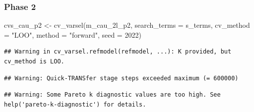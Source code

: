 \documentclass[
]{article}
\newenvironment{Shaded}{\begin{snugshade}}{\end{snugshade}}
\newcommand{\AttributeTok}[1]{\textcolor[rgb]{0.77,0.63,0.00}{#1}}
\newcommand{\DecValTok}[1]{\textcolor[rgb]{0.00,0.00,0.81}{#1}}
\newcommand{\FunctionTok}[1]{\textcolor[rgb]{0.00,0.00,0.00}{#1}}
\newcommand{\NormalTok}[1]{#1}
\newcommand{\OtherTok}[1]{\textcolor[rgb]{0.56,0.35,0.01}{#1}}
\newcommand{\StringTok}[1]{\textcolor[rgb]{0.31,0.60,0.02}{#1}}
\begin{document}
\hypertarget{phase-2}{%
\subsubsection{Phase 2}\label{phase-2}}

\begin{Shaded}
\begin{Highlighting}[]
\NormalTok{cvs\_cau\_p2 }\OtherTok{\textless{}{-}} \FunctionTok{cv\_varsel}\NormalTok{(m\_cau\_2l\_p2, }
                        \AttributeTok{search\_terms =}\NormalTok{ s\_terms, }
                        \AttributeTok{cv\_method =} \StringTok{"LOO"}\NormalTok{, }\AttributeTok{method =} \StringTok{"forward"}\NormalTok{, }
                        \AttributeTok{seed =} \DecValTok{2022}\NormalTok{)}
\end{Highlighting}
\end{Shaded}

\begin{verbatim}
## Warning in cv_varsel.refmodel(refmodel, ...): K provided, but cv_method is LOO.
\end{verbatim}

\begin{verbatim}
## Warning: Quick-TRANSfer stage steps exceeded maximum (= 600000)
\end{verbatim}

\begin{verbatim}
## Warning: Some Pareto k diagnostic values are too high. See help('pareto-k-diagnostic') for details.
\end{verbatim}
\end{document}

